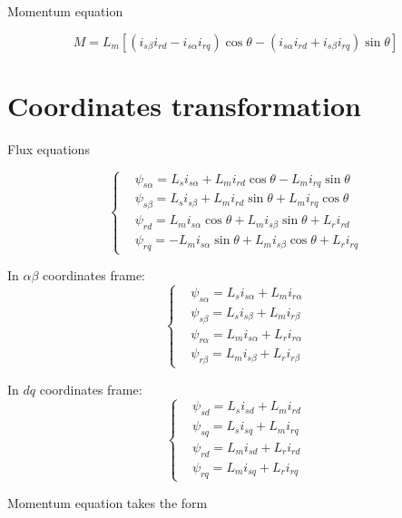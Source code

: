 \documentclass[11pt,a4paper,oneside]{report}
\begin{document}
Momentum equation

\begin{equation}
	M=L_m\left[(i_{s\beta}i_{rd}-i_{s\alpha}i_{rq})\cos\theta-(i_{s\alpha}i_{rd}+i_{s\beta}i_{rq})\sin\theta\right]
\end{equation}

\section{Coordinates transformation}

Flux equations

\begin{equation}
	\left\{
	\begin{split}
		& \psi_{s\alpha} = L_si_{s\alpha}+L_mi_{rd}\cos\theta-L_mi_{rq}\sin\theta\\
		& \psi_{s\beta} = L_si_{s\beta}+L_mi_{rd}\sin\theta+L_mi_{rq}\cos\theta\\
		& \psi_{rd} = L_mi_{s\alpha}\cos\theta+L_mi_{s\beta}\sin\theta+L_ri_{rd}\\
		& \psi_{rq} = -L_mi_{s\alpha}\sin\theta+L_mi_{s\beta}\cos\theta+L_ri_{rq}
	\end{split}
	\right.
\end{equation}

In $\alpha\beta$ coordinates frame:
\begin{equation}
	\left\{
	\begin{split}
		& \psi_{s\alpha} = L_si_{s\alpha}+L_mi_{r\alpha}\\
		& \psi_{s\beta} = L_si_{s\beta}+L_mi_{r\beta}\\
		& \psi_{r\alpha} = L_mi_{s\alpha}+L_ri_{r\alpha}\\
		& \psi_{r\beta} = L_mi_{s\beta}+L_ri_{r\beta}
	\end{split}
	\right.
\end{equation}

In $dq$ coordinates frame:
\begin{equation}
	\left\{
	\begin{split}
		& \psi_{sd} = L_si_{sd}+L_mi_{rd}\\
		& \psi_{sq} = L_si_{sq}+L_mi_{rq}\\
		& \psi_{rd} = L_mi_{sd}+L_ri_{rd}\\
		& \psi_{rq} = L_mi_{sq}+L_ri_{rq}
	\end{split}
	\right.
\end{equation}

Momentum equation takes the form
\end{document}
